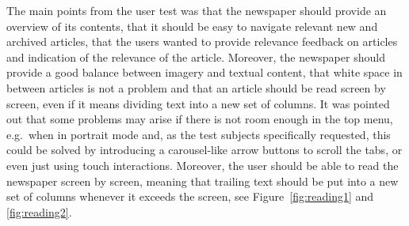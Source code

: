 The main points from the user test was that the newspaper should provide an overview of its contents, that it should be easy to navigate relevant new and archived articles, that the users wanted to provide relevance feedback on articles and indication of the relevance of the article. Moreover, the newspaper should provide a good balance between imagery and textual content, that white space in between articles is not a problem and that an article should be read screen by screen, even if it means dividing text into a new set of columns. It was pointed out that some problems may arise if there is not room enough in the top menu, e.g.\ when in portrait mode and, as the test subjects specifically requested, this could be solved by introducing a carousel-like arrow buttons to scroll the tabs, or even just using touch interactions. Moreover, the user should be able to read the newspaper screen by screen, meaning that trailing text should be put into a new set of columns whenever it exceeds the screen, see Figure~\ref{fig:reading1} and \ref{fig:reading2}.
